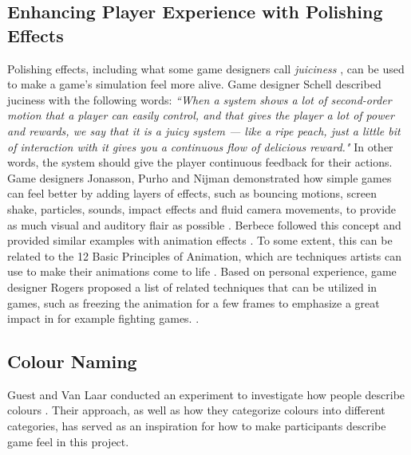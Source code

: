 \subsection{Enhancing Player Experience with Polishing Effects} \label{polishSection}
Polishing effects, including what some game designers call \textit{juiciness} \cite{juice3}, can be used to make a game's simulation feel more alive. Game designer Schell described juciness with the following words: \textit{``When a system shows a lot of second-order motion that a player can easily control, and that gives the player a lot of power and rewards, we say that it is a juicy system --- like a ripe peach, just a little bit of interaction with it gives you a continuous flow of delicious reward."} \cite{schell_art_2008} In other words, the system should give the player continuous feedback for their actions. Game designers Jonasson, Purho and Nijman demonstrated how simple games can feel better by adding layers of effects, such as bouncing motions, screen shake, particles, sounds, impact effects and fluid camera movements, to provide as much visual and auditory flair as possible \cite{juice1, juice2}. Berbece followed this concept and provided similar examples with animation effects \cite{animationSucks}. To some extent, this can be related to the 12 Basic Principles of Animation, which are techniques artists can use to make their animations come to life \cite{animation}. Based on personal experience, game designer Rogers proposed a list of related techniques that can be utilized in games, such as freezing the animation for a few frames to emphasize a great impact in for example fighting games. \cite{sticky}.\newpage
\subsection{Colour Naming} \label{colour}
Guest and Van Laar conducted an experiment to investigate how people describe colours \cite{guest_structure_2000}. Their approach, as well as how they categorize colours into different categories, has served as an inspiration for how to make participants describe game feel in this project.


